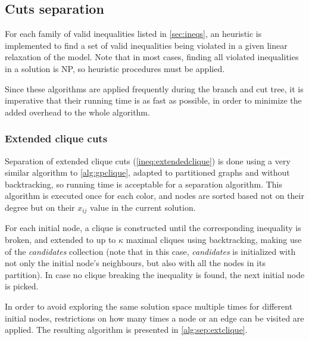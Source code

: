 \subsection{Cuts separation}

For each family of valid inequalities listed in \ref{sec:ineqs}, an heuristic is implemented to find a set of valid inequalities being violated in a given linear relaxation of the model. Note that in most cases, finding all violated inequalities in a solution is NP, so heuristic procedures must be applied. 

Since these algorithms are applied frequently during the branch and cut tree, it is imperative that their running time is as fast as possible, in order to minimize the added overhead to the whole algorithm.

\subsubsection*{Extended clique cuts}

Separation of extended clique cuts (\ref{ineq:extendedclique}) is done using a very similar algorithm to \ref{alg:gpclique}, adapted to partitioned graphs and without backtracking, so running time is acceptable for a separation algorithm. This algorithm is executed once for each color, and nodes are sorted based not on their degree but on their $x_{ij}$ value in the current solution.

For each initial node, a clique is constructed until the corresponding inequality is broken, and extended to up to $\kappa$ maximal cliques using backtracking, making use of the \textit{candidates} collection (note that in this case, \textit{candidates} is initialized with not only the initial node's neighbours, but also with all the nodes in its partition). In case no clique breaking the inequality is found, the next initial node is picked.

In order to avoid exploring the same solution space multiple times for different initial nodes, restrictions on how many times a node or an edge can be visited are applied. The resulting algorithm is presented in \ref{alg:sep:extclique}.

